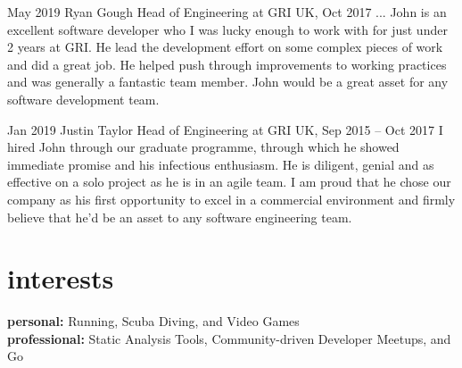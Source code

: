 \documentclass[]{friggeri-cv-a4} %
\begin{document}
\begin{entrylist}

\entry
{May 2019}
{Ryan Gough}
{Head of Engineering at GRI UK, Oct 2017 ...}
{
    John is an excellent software developer who I was lucky enough to work with for just under 2 years at GRI. He lead the development effort on some complex pieces of work and did a great job. He helped push through improvements to working practices and was generally a fantastic team member. John would be a great asset for any software development team.
}

\entry
{Jan 2019}
{Justin Taylor}
{Head of Engineering at GRI UK, Sep 2015 -- Oct 2017}
{
    I hired John through our graduate programme, through which he showed immediate promise and his infectious enthusiasm. He is diligent, genial and as effective on a solo project as he is in an agile team. I am proud that he chose our company as his first opportunity to excel in a commercial environment and firmly believe that he'd be an asset to any software engineering team.
}

\end{entrylist}

\section{interests}

\textbf{personal:} Running, Scuba Diving, and Video Games \\
\textbf{professional:} Static Analysis Tools, Community-driven Developer Meetups, and Go
\end{document}
